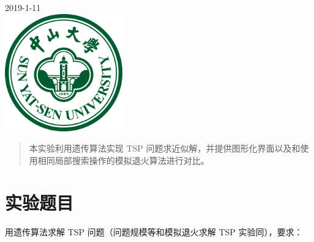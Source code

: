 \begin{titlepage}


{\large 2019-1-11}\\[1cm] %


\includegraphics[width=2in]{logo.png}\\[0.5cm] %
 

\vfill %

\end{titlepage}


\begin{abstract}
本实验利用遗传算法实现 TSP 问题求近似解，并提供图形化界面以及和使用相同局部搜索操作的模拟退火算法进行对比。

\end{abstract}


\section{实验题目}

用遗传算法求解 TSP 问题（问题规模等和模拟退火求解 TSP 实验同），要求：

